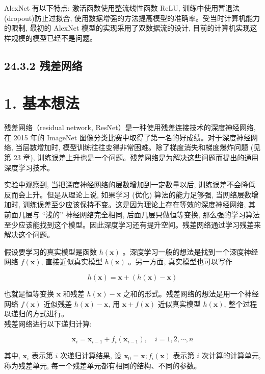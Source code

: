 \documentclass[10pt]{article}
\begin{document}
AlexNet 有以下特点: 激活函数使用整流线性函数 ReLU, 训练中使用暂退法 (dropout)防止过拟合, 使用数据增强的方法提高模型的准确率。受当时计算机能力的限制, 最初的 AlexNet 模型的实现采用了双数据流的设计, 目前的计算机实现这样规模的模型已经不是问题。

\subsection*{24.3.2 残差网络}
\section*{1. 基本想法}
残差网络（residual network, ResNet）是一种使用残差连接技术的深度神经网络, 在 2015 年的 ImageNet 图像分类比赛中取得了第一名的好成绩。对于深度神经网络, 当层数增加时, 模型训练往往变得非常困难。除了梯度消失和梯度爆炸问题 (见第 23 章), 训练误差上升也是一个问题。残差网络是为解决这些问题而提出的通用深度学习技术。

实验中观察到, 当把深度神经网络的层数增加到一定数量以后, 训练误差不会降低反而会上升。但是从理论上说, 如果学习 (优化) 算法的能力足够强, 当网络层数增加时, 训练误差至少应该保持不变。这是因为理论上存在等效的深度神经网络, 其前面几层与 “浅的” 神经网络完全相同, 后面几层只做恒等变换, 那么强的学习算法至少应该能找到这个模型。因此深度学习还有提升空间。残差网络通过学习残差来解决这个问题。

假设要学习的真实模型是函数 $h(\boldsymbol{x})$ 。深度学习一般的想法是找到一个深度神经网络 $f(\boldsymbol{x})$, 直接近似真实模型 $h(\boldsymbol{x})$ 。另一方面, 真实模型也可以写作


\begin{equation*}
h(\boldsymbol{x})=\boldsymbol{x}+(h(\boldsymbol{x})-\boldsymbol{x}) \tag{24.28}
\end{equation*}


也就是恒等变换 $\boldsymbol{x}$ 和残差 $h(\boldsymbol{x})-\boldsymbol{x}$ 之和的形式。残差网络的想法是用一个神经网络 $f(\boldsymbol{x})$ 近似残差 $h(\boldsymbol{x})-\boldsymbol{x}$, 用 $\boldsymbol{x}+f(\boldsymbol{x})$ 近似真实模型 $h(\boldsymbol{x})$, 整个过程以递归的方式进行。\\
残差网络进行以下递归计算:


\begin{equation*}
\boldsymbol{x}_{i}=\boldsymbol{x}_{i-1}+f_{i}\left(\boldsymbol{x}_{i-1}\right), \quad i=1,2, \cdots, n \tag{24.29}
\end{equation*}


其中, $\boldsymbol{x}_{i}$ 表示第 $i$ 次递归计算结果, 设 $\boldsymbol{x}_{0}=\boldsymbol{x} ; f_{i}(\boldsymbol{x})$ 表示第 $i$ 次计算的计算单元, 称为残差单元, 每一个残差单元都有相同的结构、不同的参数。
\end{document}
